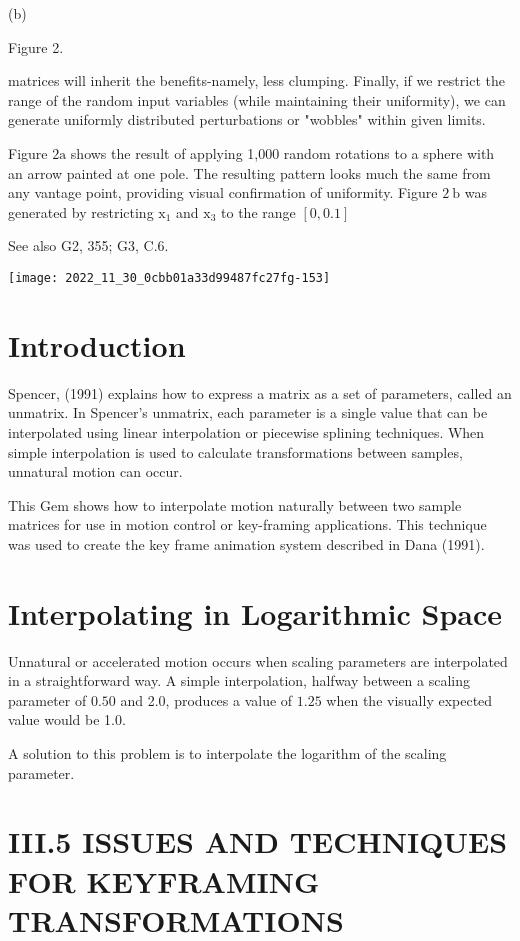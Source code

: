 (b)

Figure 2.

matrices will inherit the benefits-namely, less clumping. Finally, if we restrict the range of the random input variables (while maintaining their uniformity), we can generate uniformly distributed perturbations or "wobbles" within given limits.

Figure $2 \mathrm{a}$ shows the result of applying 1,000 random rotations to a sphere with an arrow painted at one pole. The resulting pattern looks much the same from any vantage point, providing visual confirmation of uniformity. Figure $2 \mathrm{~b}$ was generated by restricting $\mathrm{x}_{1}$ and $\mathrm{x}_{3}$ to the range $[0,0.1]$

See also G2, 355; G3, C.6.

\begin{center}
\texttt{[image: 2022\_11\_30\_0cbb01a33d99487fc27fg-153]}
\end{center}

\section{Introduction}
Spencer, (1991) explains how to express a matrix as a set of parameters, called an unmatrix. In Spencer's unmatrix, each parameter is a single value that can be interpolated using linear interpolation or piecewise splining techniques. When simple interpolation is used to calculate transformations between samples, unnatural motion can occur.

This Gem shows how to interpolate motion naturally between two sample matrices for use in motion control or key-framing applications. This technique was used to create the key frame animation system described in Dana (1991).

\section{Interpolating in Logarithmic Space}
Unnatural or accelerated motion occurs when scaling parameters are interpolated in a straightforward way. A simple interpolation, halfway between a scaling parameter of $0.50$ and 2.0, produces a value of $1.25$ when the visually expected value would be 1.0.

A solution to this problem is to interpolate the logarithm of the scaling parameter.

\section{III.5 ISSUES AND TECHNIQUES FOR KEYFRAMING TRANSFORMATIONS}
